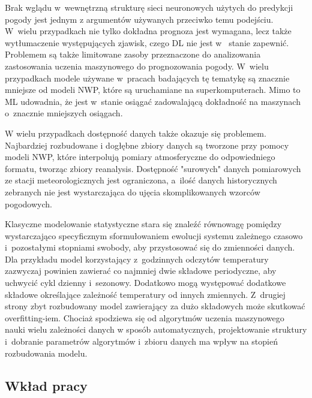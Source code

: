 Brak wglądu w~wewnętrzną strukturę sieci neuronowych użytych do predykcji pogody jest jednym
z argumentów używanych przeciwko temu podejściu. W~wielu przypadkach nie tylko dokładna
prognoza jest wymagana, lecz także wytłumaczenie występujących zjawisk, czego DL nie jest w~
stanie zapewnić. Problemem są także limitowane zasoby przeznaczone do analizowania zastosowania
uczenia maszynowego do prognozowania pogody. W~wielu przypadkach modele używane w~pracach
badających tę tematykę są znacznie mniejsze od modeli NWP, które są uruchamiane na superkomputerach.
Mimo to ML udowadnia, że jest w~stanie osiągać zadowalającą dokładność na maszynach o~znacznie
mniejszych osiągach.

W wielu przypadkach dostępność danych także okazuje się problemem. Najbardziej rozbudowane 
i dogłębne zbiory danych są tworzone przy pomocy modeli NWP, które interpolują pomiary atmosferyczne
do odpowiedniego formatu, tworząc zbiory reanalysis. Dostępność "surowych" danych pomiarowych 
ze stacji meteorologicznych
jest ograniczona, a~ilość danych historycznych zebranych nie jest wystarczająca do ujęcia 
skomplikowanych wzorców pogodowych.

Klasyczne modelowanie statystyczne stara się znaleźć równowagę pomiędzy wystarczająco specyficznym
sformułowaniem ewolucji systemu zależnego czasowo i~pozostałymi stopniami swobody, aby 
przystosować się do zmienności danych\cite{can-dl-beat-numerical}. Dla przykładu 
model korzystający z~godzinnych odczytów temperatury zazwyczaj powinien zawierać co najmniej
dwie składowe periodyczne, aby uchwycić cykl dzienny i~sezonowy. Dodatkowo mogą występować
dodatkowe składowe określające zależność temperatury od innych zmiennych. Z~drugiej strony
zbyt rozbudowany model zawierający za dużo składowych może skutkować overfitting-iem.
Chociaż spodziewa się od algorytmów uczenia maszynowego nauki wielu zależności danych
w sposób automatycznych, projektowanie struktury i~dobranie parametrów algorytmów i~zbioru danych ma wpływ na stopień rozbudowania modelu.

\subsection{Wkład pracy}

